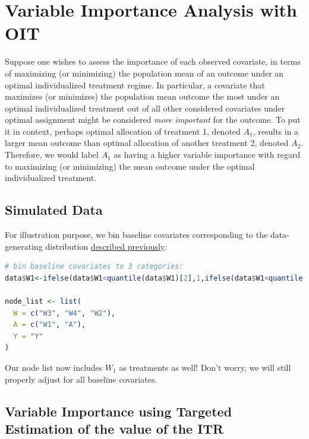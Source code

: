 \documentclass[
  12pt, krantz2,
]{krantz}
\newcommand{\1}{\mathbbm{1}}
\theoremstyle{definition}
\theoremstyle{definition}
\theoremstyle{definition}
\theoremstyle{definition}
\theoremstyle{remark}
\begin{document}
\hypertarget{variable-importance-analysis-with-oit}{%
\section{Variable Importance Analysis with OIT}\label{variable-importance-analysis-with-oit}}

Suppose one wishes to assess the importance of each observed covariate, in
terms of maximizing (or minimizing) the population mean of an outcome under an
optimal individualized treatment regime. In particular, a covariate that
maximizes (or minimizes) the population mean outcome the most under an optimal
individualized treatment out of all other considered covariates under optimal
assignment might be considered \emph{more important} for the outcome. To put it in
context, perhaps optimal allocation of treatment 1, denoted \(A_1\), results in a
larger mean outcome than optimal allocation of another treatment 2, denoted \(A_2\).
Therefore, we would label \(A_1\) as having a higher variable importance with
regard to maximizing (or minimizing) the mean outcome under the optimal
individualized treatment.

\hypertarget{simulated-data-2}{%
\subsection{Simulated Data}\label{simulated-data-2}}

For illustration purpose, we bin baseline covariates corresponding to
the data-generating distribution \protect\hyperlink{oit-eval}{described previously}:

\begin{lstlisting}[language=R]
# bin baseline covariates to 3 categories:
data$W1<-ifelse(data$W1<quantile(data$W1)[2],1,ifelse(data$W1<quantile(data$W1)[3],2,3))

node_list <- list(
  W = c("W3", "W4", "W2"),
  A = c("W1", "A"),
  Y = "Y"
)
\end{lstlisting}

Our node list now includes \(W_1\) as treatments as well! Don't worry,
we will still properly adjust for all baseline covariates.

\hypertarget{variable-importance-using-targeted-estimation-of-the-value-of-the-itr}{%
\subsection{Variable Importance using Targeted Estimation of the value of the ITR}\label{variable-importance-using-targeted-estimation-of-the-value-of-the-itr}}
\end{document}
